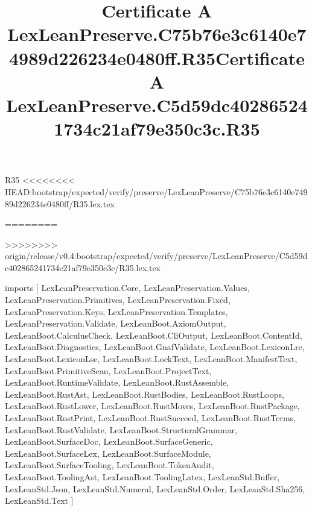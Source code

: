 \begin{lexlean}{R35}
<<<<<<<< HEAD:bootstrap/expected/verify/preserve/LexLeanPreserve/C75b76e3c6140e74989d226234e0480ff/R35.lex.tex
\title{Certificate A LexLeanPreserve.C75b76e3c6140e74989d226234e0480ff.R35}
========
\title{Certificate A LexLeanPreserve.C5d59dc402865241734c21af79e350c3c.R35}
>>>>>>>> origin/release/v0.4:bootstrap/expected/verify/preserve/LexLeanPreserve/C5d59dc402865241734c21af79e350c3c/R35.lex.tex
\begin{coremodule}
imports [
  LexLeanPreservation.Core,
  LexLeanPreservation.Values,
  LexLeanPreservation.Primitives,
  LexLeanPreservation.Fixed,
  LexLeanPreservation.Keys,
  LexLeanPreservation.Templates,
  LexLeanPreservation.Validate,
  LexLeanBoot.AxiomOutput,
  LexLeanBoot.CalculusCheck,
  LexLeanBoot.CliOutput,
  LexLeanBoot.ContentId,
  LexLeanBoot.Diagnostics,
  LexLeanBoot.GnafValidate,
  LexLeanBoot.LexiconLre,
  LexLeanBoot.LexiconLse,
  LexLeanBoot.LockText,
  LexLeanBoot.ManifestText,
  LexLeanBoot.PrimitiveScan,
  LexLeanBoot.ProjectText,
  LexLeanBoot.RuntimeValidate,
  LexLeanBoot.RustAssemble,
  LexLeanBoot.RustAst,
  LexLeanBoot.RustBodies,
  LexLeanBoot.RustLoops,
  LexLeanBoot.RustLower,
  LexLeanBoot.RustMoves,
  LexLeanBoot.RustPackage,
  LexLeanBoot.RustPrint,
  LexLeanBoot.RustSucceed,
  LexLeanBoot.RustTerms,
  LexLeanBoot.RustValidate,
  LexLeanBoot.StructuralGrammar,
  LexLeanBoot.SurfaceDoc,
  LexLeanBoot.SurfaceGeneric,
  LexLeanBoot.SurfaceLex,
  LexLeanBoot.SurfaceModule,
  LexLeanBoot.SurfaceTooling,
  LexLeanBoot.TokenAudit,
  LexLeanBoot.ToolingAst,
  LexLeanBoot.ToolingLatex,
  LexLeanStd.Buffer,
  LexLeanStd.Json,
  LexLeanStd.Numeral,
  LexLeanStd.Order,
  LexLeanStd.Sha256,
  LexLeanStd.Text
]


\end{coremodule}
\end{lexlean}
